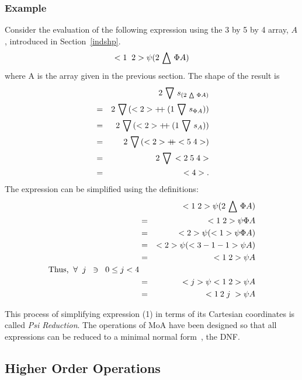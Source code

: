 \subsubsection*{Example}
Consider the evaluation of the following expression using the
3 by 5 by 4 array, $A$, introduced in Section~\ref{indshp}.
\begin{eqnarray}
             <1\;\; 2> \psi (2 \,\bigtriangleup\, \Phi A) 
\end{eqnarray}
where A is the array given in the previous section.
The shape of the result is 
\begin{eqnarray}
                & &  2 \drop s_{(2 \take \Phi A)} \nonumber \\
                & = & 2 \drop (<2> \cat (1 \drop s_{\Phi A} )) \nonumber \\
               & = & 2 \drop (<2> \cat (1 \drop s_A)) \nonumber \\
               & = & 2 \drop (<2> \cat <5\; 4>) \nonumber \\
               & = & 2 \drop <2\; 5 \;4> \nonumber \\
              &  = &<4> . 
\end{eqnarray}
The expression can be simplified using the definitions:
\begin{eqnarray}
          &&   <1\; 2> \psi (2 \,\bigtriangleup\, \Phi A) \nonumber \\
           & = &  <1 \; 2> \psi \Phi A \nonumber \\
         &   = & <2> \psi (<1> \psi \Phi A) \nonumber \\
         &  = & <2> \psi (<3 - 1 - 1 > \psi A) \nonumber \\
        &   = & <1 \; 2> \psi A  \nonumber \\
\mbox {Thus,} \;\;\forall \;\; j \;\;\ni \;\;0 \leq j < 4 \nonumber \\
&=&  <j>  \psi <1 \; 2> \psi A  \nonumber \\
&=& <1\:2\;j\;> \psi A \nonumber\\
\end{eqnarray}

This process of simplifying expression (1) in terms of
its Cartesian coordinates is called {\em Psi Reduction}. The operations of MoA
have been designed so that all expressions can be reduced to a minimal
normal form~\cite{mul88}, the DNF.


\subsection*{Higher Order Operations}

